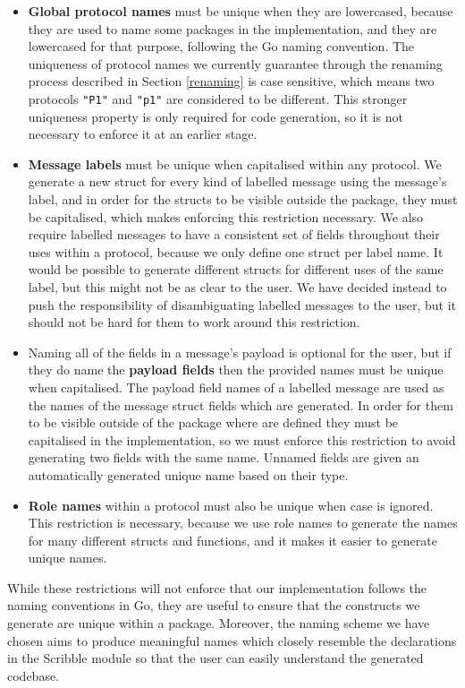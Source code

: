 \documentclass[12pt,twoside]{report}
\begin{document}
\begin{itemize}
    \item \textbf{Global protocol names} must be unique when they are lowercased, because they are used to name some packages in the implementation, and they are lowercased for that purpose, following the Go naming convention. The uniqueness of protocol names we currently guarantee through the renaming process described in Section \ref{renaming} is case sensitive, which means two protocols \texttt{"P1"} and \texttt{"p1"} are considered to be different. This stronger uniqueness property is only required for code generation, so it is not necessary to enforce it at an earlier stage.
    \item \textbf{Message labels} must be unique when capitalised within any protocol. We generate a new struct for every kind of labelled message using the message's label, and in order for the structs to be visible outside the package, they must be capitalised, which makes enforcing this restriction necessary. We also require labelled messages to have a consistent set of fields throughout their uses within a protocol, because we only define one struct per label name. It would be possible to generate different structs for different uses of the same label, but this might not be as clear to the user. We have decided instead to push the responsibility of disambiguating labelled messages to the user, but it should not be hard for them to work around this restriction.
    \item Naming all of the fields in a message's payload is optional for the user, but if they do name the \textbf{payload fields} then the provided names must be unique when capitalised. The payload field names of a labelled message are used as the names of the message struct fields which are generated. In order for them to be visible outside of the package where are defined they must be capitalised in the implementation, so we must enforce this restriction to avoid generating two fields with the same name. Unnamed fields are given an automatically generated unique name based on their type.
    \item \textbf{Role names} within a protocol must also be unique when case is ignored. This restriction is necessary, because we use role names to generate the names for many different structs and functions, and it makes it easier to generate unique names.
\end{itemize}

While these restrictions will not enforce that our implementation follows the naming conventions in Go, they are useful to ensure that the constructs we generate are unique within a package. Moreover, the naming scheme we have chosen aims to produce meaningful names which closely resemble the declarations in the Scribble module so that the user can easily understand the generated codebase.
\end{document}
